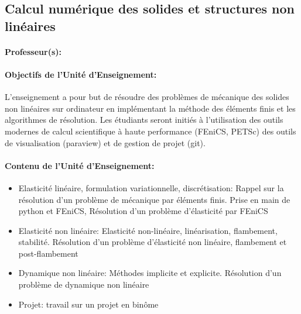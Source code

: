 
\subsection{Calcul numérique des solides et structures non linéaires}

\paragraph{Professeur(s):} 

\paragraph{Objectifs de l'Unité d'Enseignement: }
L’enseignement a pour but de résoudre des problèmes de mécanique des solides non linéaires sur ordinateur en implémentant la méthode des éléments finis et les algorithmes de résolution. 
Les étudiants seront initiés à l’utilisation des outils modernes de calcul scientifique à haute performance (FEniCS, PETSc) des outils de visualisation (paraview) et de gestion de projet (git).

\paragraph{Contenu de l’Unité d’Enseignement:}

\begin{itemize}
\item Elasticité linéaire, formulation variationnelle, discrétisation:  Rappel sur la résolution d’un problème de mécanique par éléments finis. Prise en main de python et FEniCS, Résolution d’un problème d’élasticité par FEniCS
\item	Elasticité non linéaire:  Elasticité non-linéaire, linéarisation, flambement, stabilité. Résolution d’un problème d’élasticité non linéaire, flambement et post-flambement
\item	Dynamique non linéaire: Méthodes implicite et explicite. Résolution d’un problème de dynamique non linéaire
\item	Projet: travail sur un projet en binôme
\end{itemize}

